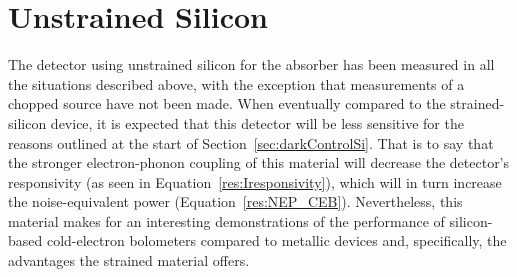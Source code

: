 \section{Unstrained Silicon}\label{sec:opticalControlSi}
The detector using unstrained silicon for the absorber has been measured in all the situations described above, with the exception that measurements of a chopped source have not been made. When eventually compared to the strained-silicon device, it is expected that this detector will be less sensitive for the reasons outlined at the start of Section~\ref{sec:darkControlSi}. That is to say that the stronger electron-phonon coupling of this material will decrease the detector's responsivity (as seen in Equation~\ref{res:Iresponsivity}), which will in turn increase the noise-equivalent power (Equation~\ref{res:NEP_CEB}). Nevertheless, this material makes for an interesting demonstrations of the performance of silicon-based cold-electron bolometers compared to metallic devices and, specifically, the advantages the strained material offers.
%
